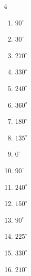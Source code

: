\begin{multicols}{4}
\begin{enumerate}
  \item $\displaystyle 90^{\circ}$

  \item $\displaystyle 30^{\circ}$

\columnbreak %

  \item $\displaystyle 270^{\circ}$

  \item $\displaystyle 330^{\circ}$

  \item $\displaystyle 240^{\circ}$

  \item $\displaystyle 360^{\circ}$
        \phantom{$\displaystyle =2\pi$}

  \item $\displaystyle 180^{\circ}$
        \phantom{$\displaystyle =\pi$}

  \item $\displaystyle 135^{\circ}$

  \item $\displaystyle 0^{\circ}$
        \phantom{$\displaystyle =0$}

  \item $\displaystyle 90^{\circ}$

  \item $\displaystyle 240^{\circ}$

  \item $\displaystyle 150^{\circ}$

  \item $\displaystyle 90^{\circ}$

  \item $\displaystyle 225^{\circ}$

  \item $\displaystyle 330^{\circ}$

  \item $\displaystyle 210^{\circ}$


\end{enumerate}
\end{multicols}
